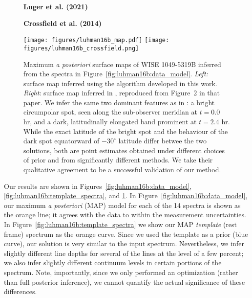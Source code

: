 \documentclass[modern]{aastex631}
\begin{document}
\begin{figure}[t!]
    \begin{centering}
        \begin{minipage}[t]{0.49\linewidth}
            \centering
            \quad\quad\quad
            \textbf{Luger et al. (2021)}
        \end{minipage}
        \vspace{1em}
        \begin{minipage}[t]{0.49\linewidth}
            \centering
            \textbf{Crossfield et al. (2014)}
        \end{minipage}
        \texttt{[image: figures/luhman16b\_map.pdf]} %
        \texttt{[image: figures/luhman16b\_crossfield.png]} %
        \caption{%
            Maximum \emph{a posteriori} surface maps of WISE 1049-5319B inferred from the spectra in Figure~\ref{fig:luhman16b:data_model}. 
            \emph{Left:} surface map inferred using the algorithm developed in this work. 
            \emph{Right}: surface map inferred in \citet{Crossfield2014}, reproduced from Figure~2 in that paper.
            We infer the same two dominant features as in \citet{Crossfield2014b}:
            a bright circumpolar spot, seen along the sub-observer meridian at $t = 0.0$ hr,
            and a dark, latitudinally elongated band prominent at $t = 2.4$ hr.
            While the exact latitude of the bright spot and the behaviour of the dark spot equatorward of $-30^\circ$ latitude differ betwee the two solutions, both are point estimates obtained under different choices of prior and from significantly different methods.
            We take their qualitative agreement to be a successful validation of our method.
        }
        \label{fig:luhman16b:maps}
    \end{centering}
\end{figure}

Our results are shown in Figures~\ref{fig:luhman16b:data_model}, \ref{fig:luhman16b:template_spectra}, and \ref{fig:luhman16b:maps}.
In Figure~\ref{fig:luhman16b:data_model}, our maximum \emph{a posteriori} (MAP) model for each of the 14 spectra is shown as the orange line; it agrees with the data to within the measurement uncertainties.
In Figure~\ref{fig:luhman16b:template_spectra} we show our MAP \emph{template} (rest frame) spectrum as the orange curve.
Since we used the \citet{Crossfield2014} template as a prior (blue curve), our solution is very similar to the input spectrum.
Nevertheless, we infer slightly different line depths for several of the lines at the level of a few percent; we also infer slightly different continuum levels in certain portions of the spectrum.
Note, importantly, since we only performed an optimization (rather than full posterior inference), we cannot quantify the actual significance of these differences.
\end{document}

